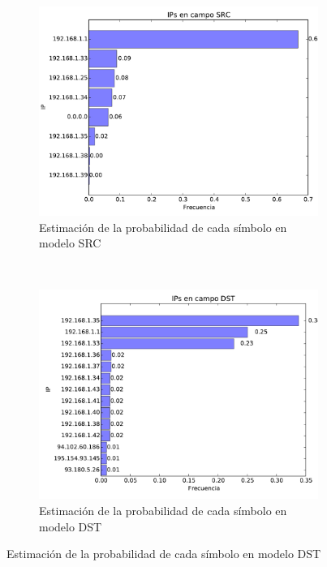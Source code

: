 \begin{figure}[H]
	\center
	\begin{subfigure}{0.4\textwidth}
		\includegraphics[width=1.0\textwidth]{resultados/casa/ipsSrc_1_6805902069.pdf}
		\caption{Estimaci\'on de la probabilidad de cada s\'imbolo en modelo SRC}
	\end{subfigure}
	~
	\begin{subfigure}{0.4\textwidth}
		\includegraphics[width=1.0\textwidth]{resultados/casa/ipsDst_2_67355481854.pdf}
		\caption{Estimaci\'on de la probabilidad de cada s\'imbolo en modelo DST}
	\end{subfigure}
\end{figure}


